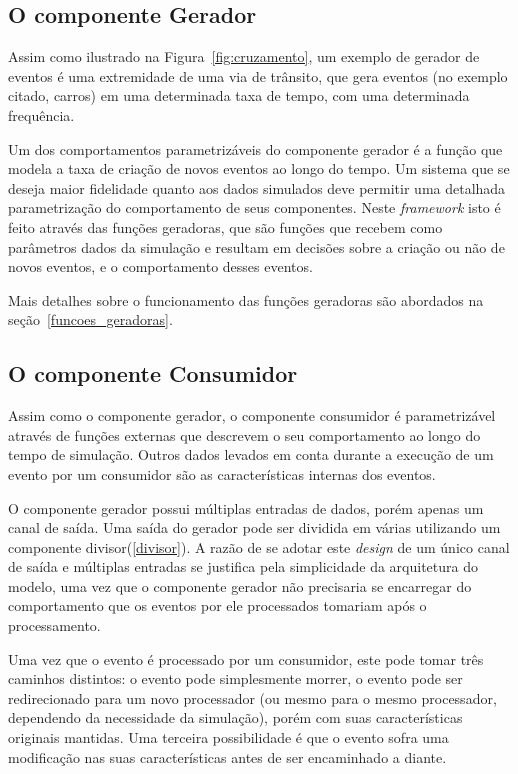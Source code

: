 \subsection{O componente Gerador}

Assim como ilustrado na Figura~\ref{fig:cruzamento}, um exemplo de gerador de eventos é uma extremidade de uma via de trânsito, que gera eventos (no exemplo citado, carros) em uma determinada taxa de tempo, com uma determinada frequência.

Um dos comportamentos parametrizáveis do componente gerador é a função que modela a taxa de criação de novos eventos ao longo do tempo. Um sistema que se deseja maior fidelidade quanto aos dados simulados deve permitir uma detalhada parametrização do comportamento de seus componentes. Neste \textit{framework} isto é feito através das funções geradoras, que são funções que recebem como parâmetros dados da simulação e resultam em decisões sobre a criação ou não de novos eventos, e o comportamento desses eventos.

Mais detalhes sobre o funcionamento das funções geradoras são abordados na seção~\ref{funcoes_geradoras}.

\subsection{O componente Consumidor}

Assim como o componente gerador, o componente consumidor é parametrizável através de funções externas que descrevem o seu comportamento ao longo do tempo de simulação. Outros dados levados em conta durante a execução de um evento por um consumidor são as características internas dos eventos.

O componente gerador possui múltiplas entradas de dados, porém apenas um canal de saída. Uma saída do gerador pode ser dividida em várias utilizando um componente divisor(\ref{divisor}). A razão de se adotar este \textit{design} de um único canal de saída e múltiplas entradas se justifica pela simplicidade da arquitetura do modelo, uma vez que o componente gerador não precisaria se encarregar do comportamento que os eventos por ele processados tomariam após o processamento.

Uma vez que o evento é processado por um consumidor, este pode tomar três caminhos distintos: o evento pode simplesmente morrer, o evento pode ser redirecionado para um novo processador (ou mesmo para o mesmo processador, dependendo da necessidade da simulação), porém com suas características originais mantidas. Uma terceira possibilidade é que o evento sofra uma modificação nas suas características antes de ser encaminhado a diante.

